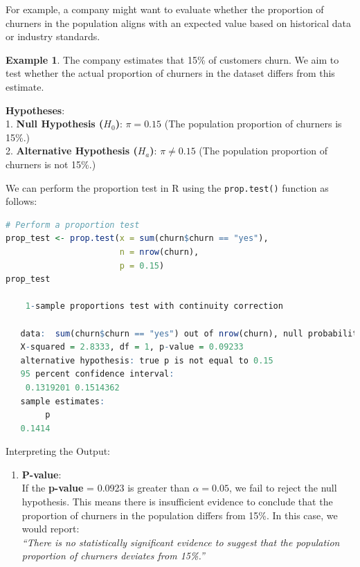 \documentclass[
]{book}
\newcommand{\passthrough}[1]{#1}
\providecommand{\tightlist}{%
  \setlength{\itemsep}{0pt}\setlength{\parskip}{0pt}}
\theoremstyle{definition}
\theoremstyle{definition}
\newtheorem{example}{Example}[chapter]
\theoremstyle{definition}
\theoremstyle{definition}
\theoremstyle{remark}
\begin{document}
For example, a company might want to evaluate whether the proportion of churners in the population aligns with an expected value based on historical data or industry standards.

\begin{example}
\protect\hypertarget{exm:ex-test-proportion}{}\label{exm:ex-test-proportion}The company estimates that 15\% of customers churn. We aim to test whether the actual proportion of churners in the dataset differs from this estimate.

\textbf{Hypotheses}:\\
1. \textbf{Null Hypothesis (\(H_0\))}: \(\pi = 0.15\) (The population proportion of churners is 15\%.)\\
2. \textbf{Alternative Hypothesis (\(H_a\))}: \(\pi \neq 0.15\) (The population proportion of churners is not 15\%.)

We can perform the proportion test in R using the \passthrough{\lstinline!prop.test()!} function as follows:

\begin{lstlisting}[language=R]
# Perform a proportion test
prop_test <- prop.test(x = sum(churn$churn == "yes"), 
                       n = nrow(churn), 
                       p = 0.15)
prop_test
   
    1-sample proportions test with continuity correction
   
   data:  sum(churn$churn == "yes") out of nrow(churn), null probability 0.15
   X-squared = 2.8333, df = 1, p-value = 0.09233
   alternative hypothesis: true p is not equal to 0.15
   95 percent confidence interval:
    0.1319201 0.1514362
   sample estimates:
        p 
   0.1414
\end{lstlisting}

Interpreting the Output:

\begin{enumerate}
\def\labelenumi{\arabic{enumi}.}
\tightlist
\item
  \textbf{P-value}:\\
  If the \textbf{p-value} = 0.0923 is greater than \(\alpha = 0.05\), we fail to reject the null hypothesis. This means there is insufficient evidence to conclude that the proportion of churners in the population differs from 15\%. In this case, we would report:\\
  \emph{``There is no statistically significant evidence to suggest that the population proportion of churners deviates from 15\%.''}
\end{enumerate}


\end{example}
\end{document}
